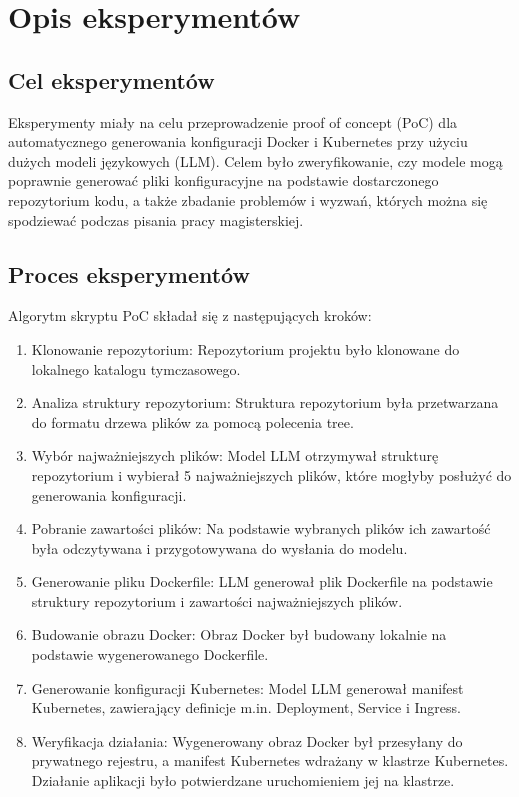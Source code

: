 \clearpage %
\section{Opis eksperymentów}

\subsection{Cel eksperymentów}

Eksperymenty miały na celu przeprowadzenie proof of concept (PoC) dla automatycznego generowania konfiguracji Docker i Kubernetes przy użyciu dużych modeli językowych (LLM). Celem było zweryfikowanie, czy modele mogą poprawnie generować pliki konfiguracyjne na podstawie dostarczonego repozytorium kodu, a także zbadanie problemów i wyzwań, których można się spodziewać podczas pisania pracy magisterskiej.

\subsection{Proces eksperymentów}

Algorytm skryptu PoC składał się z następujących kroków:

\begin{enumerate}
    \item Klonowanie repozytorium: Repozytorium projektu było klonowane do lokalnego katalogu tymczasowego.
    \item Analiza struktury repozytorium: Struktura repozytorium była przetwarzana do formatu drzewa plików za pomocą polecenia tree.
    \item Wybór najważniejszych plików: Model LLM otrzymywał strukturę repozytorium i wybierał 5 najważniejszych plików, które mogłyby posłużyć do generowania konfiguracji.
    \item Pobranie zawartości plików: Na podstawie wybranych plików ich zawartość była odczytywana i przygotowywana do wysłania do modelu.
    \item Generowanie pliku Dockerfile: LLM generował plik Dockerfile na podstawie struktury repozytorium i zawartości najważniejszych plików.
    \item Budowanie obrazu Docker: Obraz Docker był budowany lokalnie na podstawie wygenerowanego Dockerfile.
    \item Generowanie konfiguracji Kubernetes: Model LLM generował manifest Kubernetes, zawierający definicje m.in. Deployment, Service i Ingress.
    \item Weryfikacja działania: Wygenerowany obraz Docker był przesyłany do prywatnego rejestru, a manifest Kubernetes wdrażany w klastrze Kubernetes. Działanie aplikacji było potwierdzane uruchomieniem jej na klastrze.
\end{enumerate}


